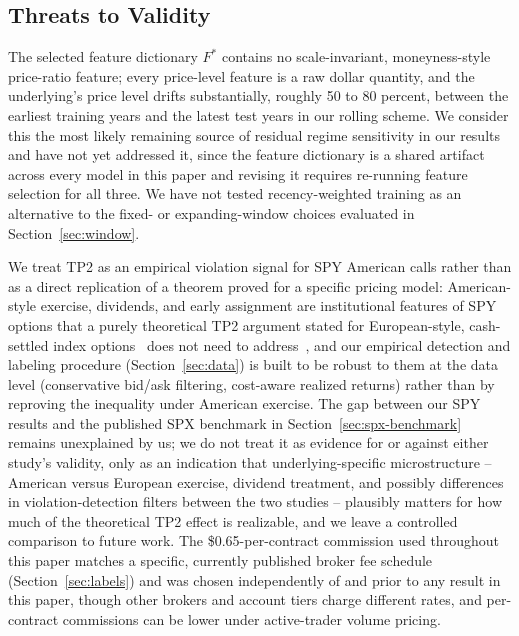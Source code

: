 \documentclass[sigconf,review,anonymous]{acmart}
\begin{document}
\subsection{Threats to Validity}
\label{sec:limitations}
The selected feature dictionary $F^{\ast}$ contains no scale-invariant, moneyness-style price-ratio feature; every price-level feature is a raw dollar quantity, and the underlying's price level drifts substantially, roughly 50 to 80 percent, between the earliest training years and the latest test years in our rolling scheme. We consider this the most likely remaining source of residual regime sensitivity in our results and have not yet addressed it, since the feature dictionary is a shared artifact across every model in this paper and revising it requires re-running feature selection for all three. We have not tested recency-weighted training as an alternative to the fixed- or expanding-window choices evaluated in Section~\ref{sec:window}.

We treat TP2 as an empirical violation signal for SPY American calls rather than as a direct replication of a theorem proved for a specific pricing model: American-style exercise, dividends, and early assignment are institutional features of SPY options that a purely theoretical TP2 argument stated for European-style, cash-settled index options~\cite{glasserman2026tp2theory} does not need to address~\cite{cosma2020earlyexercise}, and our empirical detection and labeling procedure (Section~\ref{sec:data}) is built to be robust to them at the data level (conservative bid/ask filtering, cost-aware realized returns) rather than by reproving the inequality under American exercise. The gap between our SPY results and the published SPX benchmark in Section~\ref{sec:spx-benchmark} remains unexplained by us; we do not treat it as evidence for or against either study's validity, only as an indication that underlying-specific microstructure -- American versus European exercise, dividend treatment, and possibly differences in violation-detection filters between the two studies -- plausibly matters for how much of the theoretical TP2 effect is realizable, and we leave a controlled comparison to future work. The \$0.65-per-contract commission used throughout this paper matches a specific, currently published broker fee schedule (Section~\ref{sec:labels}) and was chosen independently of and prior to any result in this paper, though other brokers and account tiers charge different rates, and per-contract commissions can be lower under active-trader volume pricing.
\end{document}
